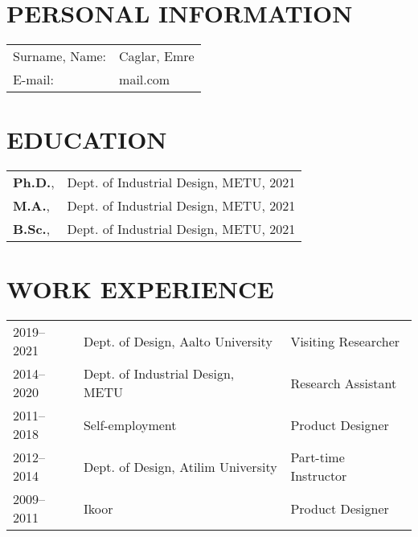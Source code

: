 \begin{curriculumvitae}
\section*{PERSONAL INFORMATION}
\begingroup
\renewcommand{\arraystretch}{1.4}
\begin{tabular}{p{2.85cm}l}
	Surname, Name: & Caglar, Emre\\
	E-mail: & mail.com
\end{tabular}
\endgroup

\section*{EDUCATION}
\begingroup
\renewcommand{\arraystretch}{1.4}

\begin{tabular}{p{.8cm}>{\raggedright\arraybackslash}p{12.4cm}}
	\textbf{Ph.D.}, &Dept. of Industrial Design, METU, 2021\\
	\textbf{M.A.}, &Dept. of Industrial Design, METU, 2021 \\%
	\textbf{B.Sc.}, &Dept. of Industrial Design, METU, 2021 \\[-.6em]
\end{tabular}

\endgroup

\section*{WORK EXPERIENCE}
\begingroup
\renewcommand{\arraystretch}{1.4}
\begin{tabular}{p{}p{}p{}}
	2019--2021 & Dept. of Design, Aalto University & Visiting Researcher \\%
	2014--2020 & Dept. of Industrial Design, METU & Research Assistant  \\%
	2011--2018 & Self-employment & Product Designer \\%
	2012--2014 & Dept. of Design, Atilim University & Part-time Instructor \\%
	2009--2011 & Ikoor & Product Designer \\
\end{tabular}
\endgroup
%


\end{curriculumvitae}
